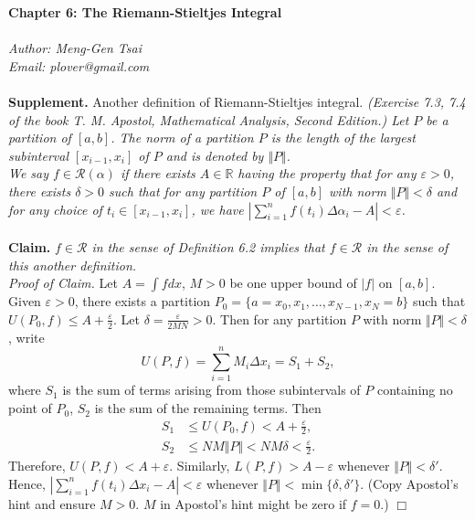 \documentclass{article}
\begin{document}
\textbf{\Large Chapter 6: The Riemann-Stieltjes Integral} \\\\



\emph{Author: Meng-Gen Tsai} \\
\emph{Email: plover@gmail.com} \\\\









\textbf{Supplement.} Another definition of Riemann-Stieltjes integral.
\emph{(Exercise 7.3, 7.4 of the book
T. M. Apostol, Mathematical Analysis, Second Edition.)
Let $P$ be a partition of $[a, b]$.
The norm of a partition $P$ is the length of the largest subinterval $[x_{i-1}, x_i]$
of $P$ and is denoted by $\Vert P \Vert$.} \\

\emph{We say $f \in \mathscr{R}(\alpha)$
if there exists $A \in \mathbb{R}$ having the property that
for any $\varepsilon > 0$, there exists $\delta > 0$ such that
for any partition $P$ of $[a, b]$ with norm $\Vert P \Vert < \delta$
and for any choice of $t_i \in [x_{i-1}, x_i]$,
we have $|\sum_{i = 1}^{n} f(t_i) \Delta \alpha_i - A| < \varepsilon$.} \\\\

\textbf{Claim.}
\emph{$f \in \mathscr{R}$ in the sense of Definition 6.2
implies that
$f \in \mathscr{R}$ in the sense of this another definition.} \\

\emph{Proof of Claim.}
Let $A = \int f dx$, $M > 0$ be one upper bound of $|f|$ on $[a, b]$.
Given $\varepsilon > 0$, there exists a partition
$P_0 = \{a = x_0, x_1, \ldots, x_{N-1}, x_N = b \}$
such that
$U(P_0, f) \leq A + \frac{\varepsilon}{2}$.
Let $\delta = \frac{\varepsilon}{2MN} > 0$.
Then for any partition $P$ with norm $\Vert P \Vert < \delta$, write
$$U(P, f) = \sum_{i = 1}^{n} M_i \Delta x_i = S_1 + S_2,$$
where
$S_1$ is the sum of terms arising from those subintervals of $P$ containing no point of $P_0$,
$S_2$ is the sum of the remaining terms.
Then
\begin{align*}
S_1 &\leq U(P_0, f) < A + \frac{\varepsilon}{2}, \\
S_2 &\leq NM \Vert P \Vert < NM \delta < \frac{\varepsilon}{2}.
\end{align*}
Therefore, $U(P, f) < A + \varepsilon$.
Similarly, $L(P, f) > A - \varepsilon$ whenever $\Vert P \Vert < \delta'$.
Hence, $|\sum_{i = 1}^{n} f(t_i) \Delta x_i - A| < \varepsilon$
whenever $\Vert P \Vert < \min\{\delta, \delta'\}$.
(Copy Apostol's hint and ensure $M > 0$. $M$ in Apostol's hint might be zero if $f = 0$.)
$\Box$ \\
\end{document}
